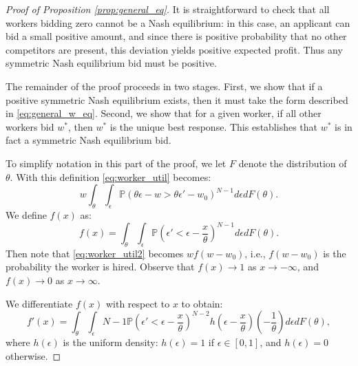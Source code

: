 \documentclass[11pt]{article}
\renewcommand{\P}{\ensuremath{\mathbb{P}}}
\begin{document}
\begin{proof}[Proof of Proposition \ref{prop:general_eq}]
It is straightforward to check that all workers bidding zero cannot be a Nash equilibrium:
in this case, an applicant can bid a small positive amount, and since there is positive probability that no other competitors are present, this deviation yields positive expected profit.
Thus any symmetric Nash equilibrium bid must be positive.

The remainder of the proof proceeds in two stages.
First, we show that if a positive symmetric Nash equilibrium exists, then it must take the form described in \eqref{eq:general_w_eq}.
Second, we show that for a given worker, if all other workers bid $w^*$, then $w^*$ is the unique best response.
This establishes that $w^*$ is in fact a symmetric Nash equilibrium bid.

To simplify notation in this part of the proof, we let $F$ denote the distribution of $\theta$.  
With this definition \eqref{eq:worker_util} becomes:
\begin{equation}
\label{eq:worker_util2}
 w \int_\theta  \int_\epsilon \P(\theta \epsilon - w > \theta \epsilon' - w_0)^{N-1} d\epsilon dF(\theta).
\end{equation}
We define $f(x)$ as:
\begin{equation}
\label{eq:f}
f(x) = \int_\theta \int_\epsilon \P\left(\epsilon' < \epsilon - \frac{x}{\theta}\right)^{N-1} d\epsilon dF(\theta)  .
\end{equation}
Then note that \eqref{eq:worker_util2} becomes $w f(w - w_0)$, i.e., $f(w - w_0)$ is the probability the worker is hired. 
Observe that $f(x) \to 1$ as $x \to -\infty$, and $f(x) \to 0$ as $x \to \infty$.

We differentiate $f(x)$ with respect to $x$ to obtain:
\begin{equation}
\label{eq:fprime}
f'(x) = \int_\theta \int_\epsilon {N-1} \P\left(\epsilon' < \epsilon - \frac{x}{\theta}\right)^{N-2} h\left( \epsilon - \frac{x}{\theta}\right) \left( - \frac{1}{\theta} \right) d\epsilon dF(\theta),
\end{equation}
where $h(\epsilon)$ is the uniform density: $h(\epsilon) = 1$ if $\epsilon \in [0,1]$, and $h(\epsilon) = 0$ otherwise.


\end{proof}
\end{document}
